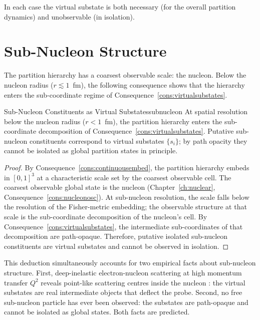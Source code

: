 In each case the virtual substate is both necessary (for the overall
partition dynamics) and unobservable (in isolation).

\section{Sub-Nucleon Structure}
\label{sec:subnucleonstructure}

The partition hierarchy has a coarsest observable scale: the nucleon.  Below
the nucleon radius ($r\lesssim 1$~fm), the following consequence shows that
the hierarchy enters the sub-coordinate regime of
Consequence~\ref{cons:virtualsubstates}.

\begin{consequence}{Sub-Nucleon Constituents as Virtual Substates}{subnucleon}
At spatial resolution below the nucleon radius ($r<1$~fm), the partition
hierarchy enters the sub-coordinate decomposition of
Consequence~\ref{cons:virtualsubstates}.  Putative sub-nucleon constituents
correspond to virtual substates $\{s_{i}\}$; by path opacity they cannot be
isolated as global partition states in principle.
\end{consequence}

\begin{proof}
By Consequence~\ref{cons:continuousembed}, the partition hierarchy embeds in
$[0,1]^{3}$ at a characteristic scale set by the coarsest observable cell.
The coarsest observable global state is the nucleon (Chapter~\ref{ch:nuclear},
Consequence~\ref{cons:nucleonosc}).  At sub-nucleon resolution, the scale
falls below the resolution of the Fisher-metric embedding; the observable
structure at that scale is the sub-coordinate decomposition of the nucleon's
cell.  By Consequence~\ref{cons:virtualsubstates}, the intermediate
sub-coordinates of that decomposition are path-opaque.  Therefore, putative
isolated sub-nucleon constituents are virtual substates and cannot be observed
in isolation.
\end{proof}

\begin{remark}
This deduction simultaneously accounts for two empirical facts about
sub-nucleon structure.  First, deep-inelastic electron-nucleon scattering at
high momentum transfer $Q^{2}$ reveals point-like scattering centres inside
the nucleon \citep{friedman1972}: the virtual substates are real intermediate
objects that deflect the probe.  Second, no free sub-nucleon particle has ever
been observed: the substates are path-opaque and cannot be isolated as global
states.  Both facts are predicted.
\end{remark}

